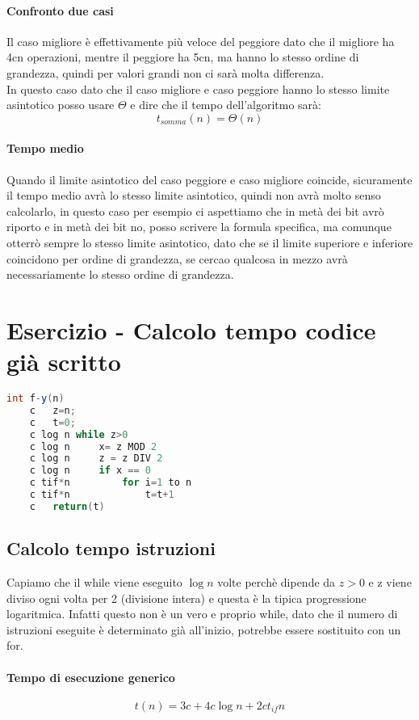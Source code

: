 \paragraph*{Confronto due casi}
Il caso migliore è effettivamente più veloce del peggiore dato che il migliore ha 4cn operazioni,
mentre il peggiore ha 5cn, ma hanno lo stesso ordine di grandezza, quindi per valori grandi non ci sarà
molta differenza.\\
In questo caso dato che il caso migliore e caso peggiore hanno lo stesso limite asintotico posso usare $\Theta$ 
e dire che il tempo dell'algoritmo sarà:
\begin{equation*}
    t_{somma}(n)=\Theta(n)
\end{equation*}
\paragraph*{Tempo medio} Quando il limite asintotico del caso peggiore e caso migliore coincide,
sicuramente il tempo medio avrà lo stesso limite asintotico, quindi non avrà molto senso calcolarlo, in
questo caso per esempio ci aspettiamo che in metà dei bit avrò riporto e in metà dei bit no, posso scrivere
la formula specifica, ma comunque otterrò sempre lo stesso limite asintotico, dato che se il limite superiore
e inferiore coincidono per ordine di grandezza, se cercao qualcosa in mezzo avrà necessariamente lo stesso
ordine di grandezza.
\section{Esercizio - Calcolo tempo codice già scritto}
\begin{lstlisting}[language=Java]
    int f-y(n)
    c   z=n;
    c   t=0;
    c log n while z>0
    c log n     x= z MOD 2
    c log n     z = z DIV 2
    c log n     if x == 0
    c tif*n         for i=1 to n
    c tif*n             t=t+1
    c   return(t)
\end{lstlisting}
\subsection{Calcolo tempo istruzioni}
Capiamo che il while viene eseguito $\log n$ volte perchè dipende da $z>0$ e
z viene diviso ogni volta per 2 (divisione intera) e questa è la tipica progressione
logaritmica. Infatti questo non è un vero e proprio while, dato che il numero di istruzioni eseguite
è determinato già all'inizio, potrebbe essere sostituito con un for.
\paragraph*{Tempo di esecuzione generico}
\begin{equation*}
    t(n)=3c+4c \log n + 2ct_{if} n
\end{equation*}
